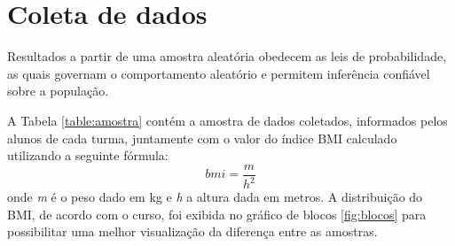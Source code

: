 \documentclass[12pt, a4paper]{article}
\begin{document}
\section{Coleta de dados}
Resultados a partir de uma amostra aleatória obedecem as leis de probabilidade, as quais governam o comportamento aleatório e permitem inferência confiável sobre a população.
\par A Tabela \ref{table:amostra} contém a amostra de dados coletados, informados pelos alunos de cada turma, juntamente com o valor do índice BMI calculado utilizando a seguinte fórmula:
\begin{equation}
bmi = \frac{m}{h^{2}}
\end{equation}
\newline onde \textit{m} é o peso dado em kg e \textit{h} a altura dada em metros. A distribuição do BMI, de acordo com o curso, foi exibida no gráfico de blocos \ref{fig:blocos} para possibilitar uma melhor visualização da diferença entre as amostras.
\pagebreak
\end{document}
